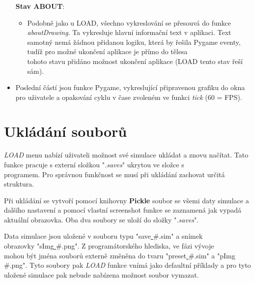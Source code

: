 \documentclass[a4paper, 12pt]{article}
\begin{document}
\begin{itemize}
        \textbf{Stav ABOUT}:
        \begin{itemize}
            \item Podobně jako u LOAD, všechno vykreslování se přesouvá do
                funkce \emph{aboutDrawing}. Ta vykresluje hlavní informační
                text v aplikaci. Text samotný nemá žádnou přidanou logiku,
                která by řešila Pygame eventy, tudíž pro možné ukončení
                aplikace je přímo do tělesa \\tohoto stavu přidáno možnost
                ukončení aplikace (LOAD tento stav řeší sám).
        \end{itemize}

    \item Poslední částí jsou funkce Pygame, vykreslující připravenou grafiku
        do okna pro uživatele a opakování cyklu v čase zvoleném ve funkci
        \emph{tick} (60 = FPS).
\end{itemize}

\newpage
\section{Ukládání souborů}
\paragraph{}
\emph{LOAD} menu nabízí uživateli možnost své simulace ukládat a znovu načítat.
Tato funkce pracuje s externí složkou "\emph{.saves}" ukrytou ve složce s
\\programem. Pro správnou funkčnost se musí při ukládání zachovat určitá
struktura. 

Při ukládání se vytvoří pomocí knihovny \textbf{Pickle} soubor se všemi daty
simulace a dalšího nastavení a pomocí vlastní screenshot funkce se zaznamená
jak vypadá aktuální obrazovka. Oba dva soubory se uloží do složky "\emph{.saves}".

Data simulace jsou uložené v souboru typu "save\underline{ }\#.sim" a snímek \\obrazovky
"sImg\underline{ }\#.png". Z programátorského hlediska, ve fázi vývoje \\mohou být jména
souborů externě změněna do tvaru "preset\underline{ }\#.sim" a "pImg\underline{ }\#.png". Tyto soubory
pak \emph{LOAD} funkce vnímá jako defaultní příklady a pro tyto uložené
simulace pak nebude nabízena možnost soubor vymazat.
\end{document}
